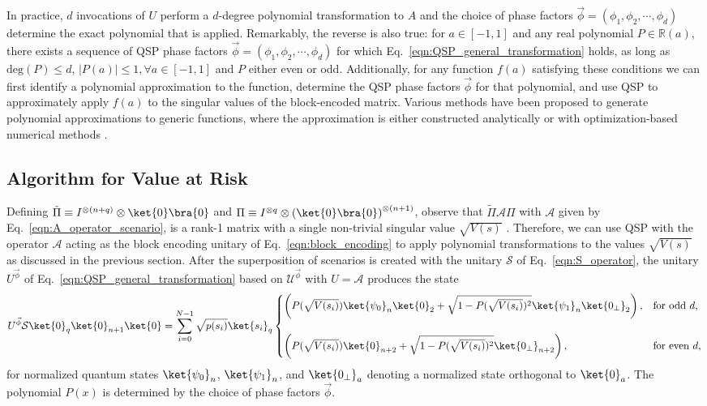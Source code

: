 \begin{enumerate}
In practice, $d$ invocations of $U$ perform a $d$-degree polynomial transformation to $A$ and the choice of phase factors $\vec{\phi}=(\phi_1, \phi_2, \cdots, \phi_d)$ determine the exact polynomial that is applied.
Remarkably, the reverse is also true:
for $a \in [-1, 1]$ and any real polynomial $P \in \mathbb{R}(a)$, there exists a sequence of QSP phase factors $\vec{\phi}=(\phi_1, \phi_2, \cdots, \phi_d)$ for which Eq.~\eqref{eqn:QSP_general_transformation}  holds, as long as $\textrm{deg}(P) \le d$, $|P(a)| \le 1, \forall a \in [-1, 1]$ and $P$ either even or odd.
Additionally, for any function $f(a)$ satisfying these conditions we can first identify a polynomial approximation to the function, determine the QSP phase factors $\vec{\phi}$ for that polynomial, and use QSP to approximately apply $f(a)$ to the singular values of the block-encoded matrix.
Various methods have been proposed to generate polynomial approximations to generic functions, where the approximation is either constructed analytically \cite{martyn2021grand, Haah2019product, chao2020finding} or with optimization-based numerical methods \cite{dong2021efficient, dong2022ground}.


\subsection{Algorithm for Value at Risk}
\label{sec:qsp_algorithm}
Defining $\tilde{\Pi} \equiv I^{\otimes (n+q)} \otimes \ket{0}\bra{0} $ and $\Pi \equiv I^{\otimes q} \otimes \left(\ket{0}\bra{0} \right)^{\otimes (n+1)}$, observe that $\tilde{\Pi}\mathcal{A}\Pi$ with $\mathcal{A}$ given by Eq.~\eqref{eqn:A_operator_scenario}, is a rank-1 matrix with a single non-trivial singular value $\sqrt{V(s)}$ \cite{gilyen2019quantum}.
Therefore, we can use QSP with the operator $\mathcal{A}$ acting as the block encoding unitary of Eq.~\eqref{eqn:block_encoding} to apply polynomial transformations to the values $\sqrt{V(s)}$ as discussed in the previous section.
After the superposition of scenarios is created with the unitary $\mathcal{S}$ of Eq.~\eqref{eqn:S_operator}, the unitary $U^{\vec{\phi}}$ of Eq.~\eqref{eqn:QSP_general_transformation} based on $\mathcal{U}^{\vec{\phi}}$ with $U=\mathcal{A}$ produces the state
\begin{equation}
	\label{eqn:qsp_derivative_transformation}
	U^{\vec{\phi}} \mathcal{S} \ket{0}_q \ket{0}_{n+1}\ket{0} = \sum_{i=0}^{N-1}\sqrt{p(s_i)}\ket{s_i}_q
	\begin{cases}
			\left(P(\sqrt{V(s_i)})\ket{\psi_0}_n\ket{0}_2 + \sqrt{1-P(\sqrt{V(s_i)})^2}\ket{\psi_1}_{n}\ket{0_{\perp}}_2 \right), & \text{for odd $d$,} \\
			& \\
			\left(P(\sqrt{V(s_i)})\ket{0}_{n+2} + \sqrt{1-P(\sqrt{V(s_i)})^2}\ket{0_{\perp}}_{n+2} \right), & \text{for even $d$,}
	\end{cases}
\end{equation}
for normalized quantum states $\ket{\psi_0}_n$, $\ket{\psi_1}_n$, and $\ket{0_{\perp}}_{a}$ denoting a normalized state orthogonal to $\ket{0}_{a}$.
The polynomial $P(x)$ is determined by the choice of phase factors $\vec{\phi}$.


\end{enumerate}
